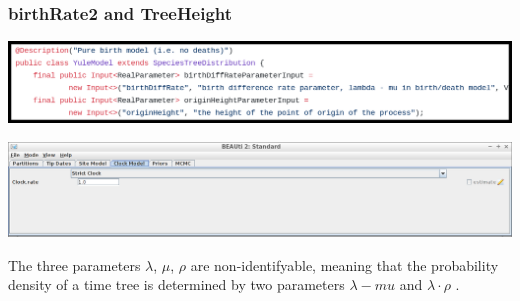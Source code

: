 \documentclass{beamer}
\begin{document}
\begin{frame}
  \frametitle{birthRate2 and TreeHeight}

  \includegraphics[width=\textwidth]{birthRate2_documentation.png}

  \includegraphics[width=\textwidth]{beauti_3.png}

  \begin{displayquote}
  The three parameters $\lambda$, $\mu$, $\rho$ are non-identifyable, meaning
  that the probability density of a time tree is determined by two parameters
  $\lambda - mu$ and $\lambda \cdot \rho$ \footnotemark.
  \end{displayquote}



\end{frame}
\end{document}
